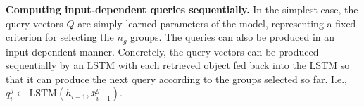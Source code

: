 \textbf{Computing input-dependent queries sequentially.} In the simplest case, the query vectors $Q$ are simply learned parameters of the model, representing a fixed criterion for selecting the $n_g$ groups. The queries can also be produced in an input-dependent manner. Concretely, the query vectors can be produced sequentially by an LSTM with each retrieved object fed back into the LSTM so that it can produce the next query according to the groups selected so far. I.e., $q_i^g \gets \mathrm{LSTM}(h_{i-1}, \bar{x}_{i-1}^g)$.